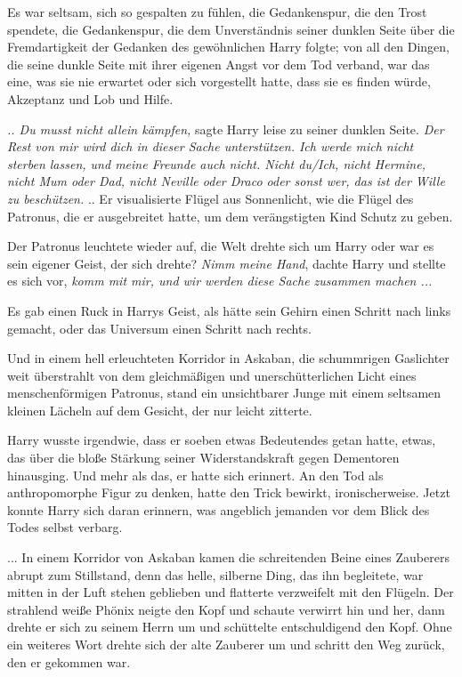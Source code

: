 Es war seltsam, sich so gespalten zu fühlen, die Gedankenspur, die den Trost
spendete, die Gedankenspur, die dem Unverständnis seiner dunklen Seite über die
Fremdartigkeit der Gedanken des gewöhnlichen Harry folgte; von all den Dingen,
die seine dunkle Seite mit ihrer eigenen Angst vor dem Tod verband, war das
eine, was sie nie erwartet oder sich vorgestellt hatte, dass sie es finden
würde, Akzeptanz und Lob und Hilfe.

\emph{.. Du musst nicht allein kämpfen,} sagte Harry leise zu seiner dunklen
Seite.\emph{ Der Rest von mir wird dich in dieser Sache unterstützen. Ich werde
mich nicht sterben lassen, und meine Freunde auch nicht. Nicht du/Ich, nicht
Hermine, nicht Mum oder Dad, nicht Neville oder Draco oder sonst wer, das ist
der Wille zu beschützen.} .. Er visualisierte Flügel aus Sonnenlicht, wie die
Flügel des Patronus, die er ausgebreitet hatte, um dem verängstigten Kind Schutz
zu geben.

Der Patronus leuchtete wieder auf, die Welt drehte sich um Harry oder war es
sein eigener Geist, der sich drehte? \emph{Nimm meine Hand}, dachte Harry und
stellte es sich vor, \emph{komm mit mir, und wir werden diese Sache zusammen
machen ...}

Es gab einen Ruck in Harrys Geist, als hätte sein Gehirn einen Schritt nach
links gemacht, oder das Universum einen Schritt nach rechts.

Und in einem hell erleuchteten Korridor in Askaban, die schummrigen Gaslichter
weit überstrahlt von dem gleichmäßigen und unerschütterlichen Licht eines
menschenförmigen Patronus, stand ein unsichtbarer Junge mit einem seltsamen
kleinen Lächeln auf dem Gesicht, der nur leicht zitterte.

Harry wusste irgendwie, dass er soeben etwas Bedeutendes getan hatte, etwas, das
über die bloße Stärkung seiner Widerstandskraft gegen Dementoren hinausging. Und
mehr als das, er hatte sich erinnert. An den Tod als anthropomorphe Figur zu
denken, hatte den Trick bewirkt, ironischerweise. Jetzt konnte Harry sich daran
erinnern, was angeblich jemanden vor dem Blick des Todes selbst verbarg.

... In einem Korridor von Askaban kamen die schreitenden Beine eines Zauberers
abrupt zum Stillstand, denn das helle, silberne Ding, das ihn begleitete, war
mitten in der Luft stehen geblieben und flatterte verzweifelt mit den Flügeln.
Der strahlend weiße Phönix neigte den Kopf und schaute verwirrt hin und her,
dann drehte er sich zu seinem Herrn um und schüttelte entschuldigend den Kopf.
Ohne ein weiteres Wort drehte sich der alte Zauberer um und schritt den Weg
zurück, den er gekommen war.

